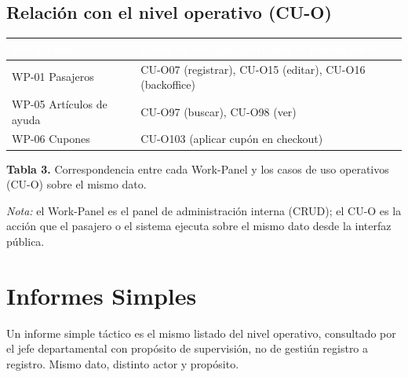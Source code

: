 \documentclass[11pt,a4paper]{article}
\newcommand{\tabla}[1]{\cellcolor{azul}\textcolor{white}{\textbf{#1}}}
\begin{document}
\subsection{Relaci\'on con el nivel operativo (CU-O)}

\renewcommand{\arraystretch}{1.25}
\begin{center}
\setlength\tabcolsep{6pt}
\begin{tabular}{@{}L{6.5cm} L{10.0cm}@{}}
\toprule
\tabla{Work-Panel} & \tabla{Casos de uso que gestionan el mismo dato} \\
\midrule
WP-01 Pasajeros & CU-O07 (registrar), CU-O15 (editar), CU-O16 (backoffice) \\
WP-05 Art\'iculos de ayuda & CU-O97 (buscar), CU-O98 (ver) \\
WP-06 Cupones & CU-O103 (aplicar cup\'on en checkout) \\
\bottomrule
\end{tabular}
\end{center}
\vspace{1pt}
\textbf{Tabla 3.} Correspondencia entre cada Work-Panel y los casos de uso operativos (CU-O) sobre el mismo dato.

\textit{Nota:} el Work-Panel es el panel de administraci\'on interna (CRUD); el CU-O es la acci\'on que el pasajero o el sistema ejecuta sobre el mismo dato desde la interfaz p\'ublica.

\section{Informes Simples}

{\small Un informe simple t\'actico es el mismo listado del nivel operativo, consultado por el jefe departamental con prop\'osito de supervisi\'on, no de gesti\'un registro a registro. Mismo dato, distinto actor y prop\'osito. \par}
\end{document}
